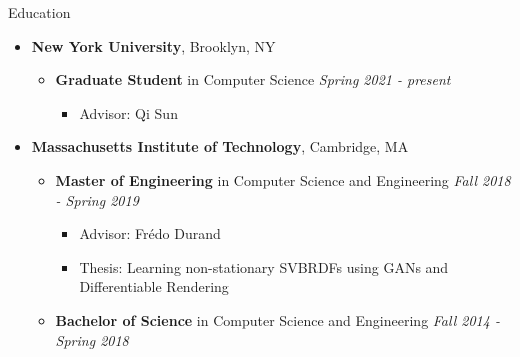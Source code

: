 \documentclass[10pt]{article}
\author{Budmonde Duinkharjav}
\begin{document}
\maketitle

\begin{area}{Education}
\begin{itemize}
    \item
        \textbf{New York University}, Brooklyn, NY
        \begin{itemize}
            \item
                \textbf{Graduate Student} in Computer Science \hfill \emph{Spring 2021 - present}
                \begin{itemize}
                    \item Advisor: Qi Sun
                \end{itemize}
        \end{itemize}
    \item
        \textbf{Massachusetts Institute of Technology}, Cambridge, MA
        \begin{itemize}
            \item
                \textbf{Master of Engineering} in Computer Science and Engineering \hfill \emph{Fall 2018 - Spring 2019}
                \begin{itemize}
                    \item Advisor: Frédo Durand
                    \item Thesis: Learning non-stationary SVBRDFs using GANs and Differentiable Rendering
                \end{itemize}
            \item 
                \textbf{Bachelor of Science} in Computer Science and Engineering \hfill \emph{Fall 2014 - Spring 2018}
        \end{itemize}
\end{itemize}
\end{area}
\end{document}
